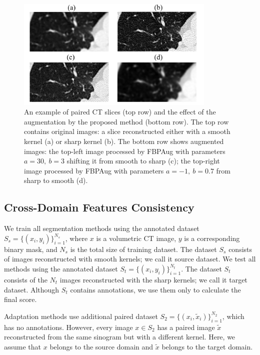 \begin{figure}[h]
	\centering
	\includegraphics[width=0.85\textwidth]{Dissertation/Figures/3_ct/4crops.png}%
	\caption{An example of paired CT slices (top row) and the effect of the augmentation by the proposed method (bottom row).  The top row contains original images: a slice reconstructed either with a smooth kernel (a) or sharp kernel (b). The bottom row shows augmented images: the top-left image processed by FBPAug with parameters $a=30,~b=3$ shifting it from smooth to sharp (c); the top-right image processed by FBPAug with parameters $a=-1,~b=0.7$ from sharp to smooth (d).}
	\label{fig:crops}
\end{figure}


\subsection{Cross-Domain Features Consistency}

We train all segmentation methods using the annotated dataset $S_s = \{ ( x_i, y_i ) \}_{i=1}^{N_s}$, where $x$ is a volumetric CT image, $y$ is a corresponding binary mask, and $N_s$ is the total size of training dataset. The dataset $S_s$ consists of images reconstructed with smooth kernels; we call it source dataset. We test all methods using the annotated dataset $S_t = \{ ( x_i, y_i ) \}_{i=1}^{N_t}$. The dataset $S_t$ consists of the $N_t$ images reconstructed with the sharp kernels; we call it target dataset. Although $S_t$ contains annotations, we use them only to calculate the final score.

Adaptation methods use additional paired dataset $S_2 = \{ ( x_i, \tilde{x}_i ) \}_{i=1}^{N_2}$, which has no annotations. However, every image $x \in S_2$ has a paired image $\tilde{x}$ reconstructed from the same sinogram but with a different kernel. Here, we assume that $x$ belongs to the source domain and $\tilde{x}$ belongs to the target domain.

